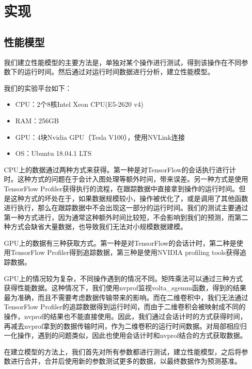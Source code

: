 \chapter{实现}
\label{cha:impl}

\section{性能模型}
\label{sec:impl_model}
    我们建立性能模型的主要方法是，单独对某个操作进行测试，得到该操作在不同参数下的运行时间。然后通过对运行时间数据进行分析，建立性能模型。
    
    我们的实验平台如下：
    
    \begin{itemize}
        \setlength{\itemindent}{1em}
        \item CPU：2个8核Intel Xeon CPU(E5-2620 v4)
        \item RAM：256GB
        \item GPU：4块Nvidia GPU（Tesla V100），使用NVLink连接
        \item OS：Ubuntu 18.04.1 LTS
    \end{itemize}

    CPU上的数据通过两种方式来获得。第一种是对TensorFlow的会话执行进行计时。这种方式的问题在于会计入图处理等额外时间，带来误差。另一种方式是使用TensorFlow Profiler获得执行的流程，在跟踪数据中直接拿到操作的运行时间。但是这种方式的坏处在于，如果数据规模较小，操作被优化了，或是调用了其他函数进行执行，那么在跟踪数据中不会出现这一部分的运行时间。我们的测试主要通过第一种方式进行，因为通常这种额外时间比较短，不会影响到我们的预测，而第二种方式会缺省大量数据，也导致我们无法对小规模数据建模。

    GPU上的数据有三种获取方式。第一种是对TensorFlow的会话计时，第二种是使用TensorFlow Profiler得到追踪数据，第三种是使用NVIDIA profiling tools获得追踪数据。
    
    GPU上的情况较为复杂，不同操作遇到的情况不同。矩阵乘法可以通过三种方式获得性能数据。这种情况下，我们使用nvprof监视volta\_sgemm函数，得到的结果最为准确，而且不需要考虑数据传输带来的影响。而在二维卷积中，我们无法通过TensorFlow Profiler的追踪数据得到运行时间，而由于二维卷积会被映射成不同的操作，nvprof的结果也不能直接使用。因此，我们通过会话计时的方式获得时间，再减去nvprof拿到的数据传输时间，作为二维卷积的运行时间数据。对局部相应归一化操作，遇到的问题类似，因此也使用会话计时和nvprof结合的方式获取数据。
    
    在建立模型的方法上，我们首先对所有参数都进行测试，建立性能模型，之后将参数进行合并，合并后使用新的参数测试更多的数据，以最终数据作为预测基准。

